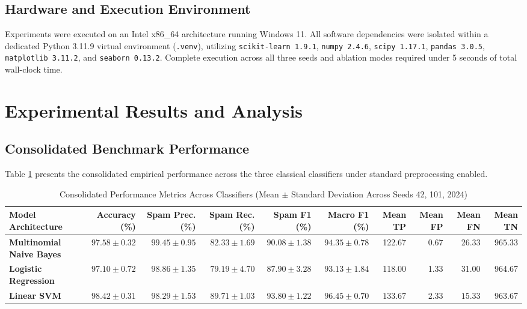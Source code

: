 \documentclass[conference]{IEEEtran}
\begin{document}
\subsection{Hardware and Execution Environment}
Experiments were executed on an Intel x86\_64 architecture running Windows 11. All software dependencies were isolated within a dedicated Python 3.11.9 virtual environment (\texttt{.venv}), utilizing \texttt{scikit-learn 1.9.1}, \texttt{numpy 2.4.6}, \texttt{scipy 1.17.1}, \texttt{pandas 3.0.5}, \texttt{matplotlib 3.11.2}, and \texttt{seaborn 0.13.2}. Complete execution across all three seeds and ablation modes required under 5 seconds of total wall-clock time.

\section{Experimental Results and Analysis}

\subsection{Consolidated Benchmark Performance}
Table \ref{tab:benchmark_results} presents the consolidated empirical performance across the three classical classifiers under standard preprocessing enabled.

\begin{table}[t]
\caption{Consolidated Performance Metrics Across Classifiers (Mean $\pm$ Standard Deviation Across Seeds 42, 101, 2024)}
\label{tab:benchmark_results}
\centering
\begin{tabular}{lrrrrrrrrr}
\toprule
\textbf{Model Architecture} & \textbf{Accuracy (\%)} & \textbf{Spam Prec. (\%)} & \textbf{Spam Rec. (\%)} & \textbf{Spam F1 (\%)} & \textbf{Macro F1 (\%)} & \textbf{Mean TP} & \textbf{Mean FP} & \textbf{Mean FN} & \textbf{Mean TN} \\
\midrule
\textbf{Multinomial Naive Bayes} & $97.58 \pm 0.32$ & $\mathbf{99.45 \pm 0.95}$ & $82.33 \pm 1.69$ & $90.08 \pm 1.38$ & $94.35 \pm 0.78$ & 122.67 & $\mathbf{0.67}$ & 26.33 & $\mathbf{965.33}$ \\
\textbf{Logistic Regression}     & $97.10 \pm 0.72$ & $98.86 \pm 1.35$ & $79.19 \pm 4.70$ & $87.90 \pm 3.28$ & $93.13 \pm 1.84$ & 118.00 & 1.33 & 31.00 & 964.67 \\
\textbf{Linear SVM}              & $\mathbf{98.42 \pm 0.31}$ & $98.29 \pm 1.53$ & $\mathbf{89.71 \pm 1.03}$ & $\mathbf{93.80 \pm 1.22}$ & $\mathbf{96.45 \pm 0.70}$ & $\mathbf{133.67}$ & 2.33 & $\mathbf{15.33}$ & 963.67 \\
\bottomrule
\end{tabular}
\end{table}
\end{document}
